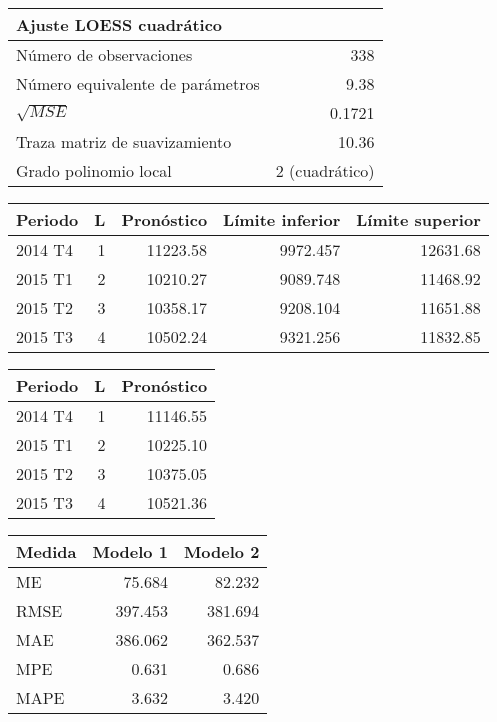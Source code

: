 \documentclass[11pt]{article}
\begin{document}
\begin{table}[ht]
\centering
\begin{tabular}{lr}
 Ajuste LOESS cuadrático & \\ 
 \hline
 Número de observaciones & 338 \\
 Número equivalente de parámetros & 9.38 \\
 $\sqrt{MSE}$ & 0.1721 \\
 Traza matriz de suavizamiento & 10.36\\
Grado polinomio local & 2 (cuadrático)\\
   \hline
\end{tabular}
\end{table}

\begin{table}[ht]
\centering
\begin{tabular}{lrrrr}
\hline
Periodo & L & Pronóstico & Límite inferior & Límite superior \\
\hline
2014 T4 & 1 & 11223.58 & 9972.457 & 12631.68 \\
2015 T1 & 2 & 10210.27 & 9089.748 & 11468.92 \\
2015 T2 & 3 & 10358.17 & 9208.104 & 11651.88 \\
2015 T3 & 4 & 10502.24 & 9321.256 & 11832.85 \\
\hline
\end{tabular}
\end{table}

\begin{table}[ht]
\centering
\begin{tabular}{lrr}
\hline
Periodo & L & Pronóstico \\
\hline
2014 T4 & 1 & 11146.55 \\
2015 T1 & 2 & 10225.10 \\
2015 T2 & 3 & 10375.05 \\
2015 T3 & 4 & 10521.36 \\
\hline
\end{tabular}
\end{table}

\begin{table}[ht]
\centering
\begin{tabular}{lrr}
\hline
Medida & Modelo 1 & Modelo 2 \\
\hline
ME & 75.684 & 82.232 \\
RMSE & 397.453 & 381.694 \\
MAE & 386.062 & 362.537 \\
MPE & 0.631 & 0.686 \\
MAPE & 3.632 & 3.420 \\
\hline
\end{tabular}
\end{table}
\end{document}
